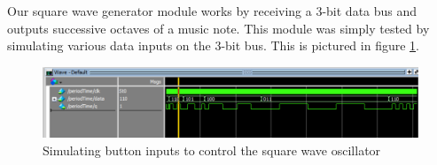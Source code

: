 \documentclass[a4paper]{article}
\begin{document}
Our square wave generator module works by receiving a 3-bit data bus and outputs successive octaves of a music note. This module was simply tested by simulating various data inputs on the 3-bit bus. This is pictured in figure \ref{squareSim}.

\begin{figure}[H]
    \includegraphics[width=0.8 \linewidth]{images/squareSim.png}
    \caption{Simulating button inputs to control the square wave oscillator}
    \label{squareSim}
\end{figure}


%
\end{document}
